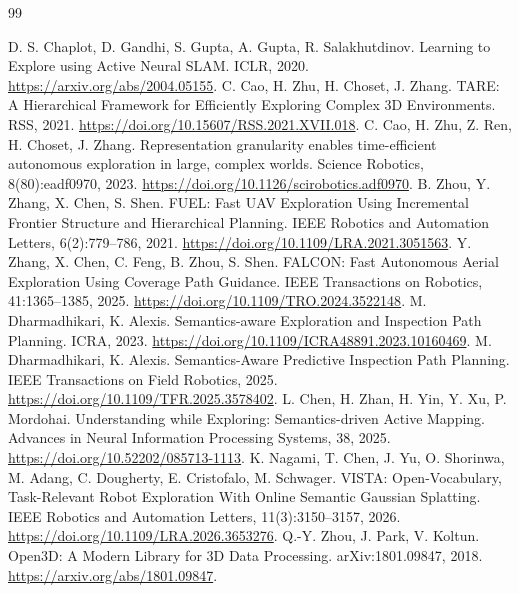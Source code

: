 \documentclass[11pt,a4paper]{article}
\begin{document}
\begin{thebibliography}{99}
\raggedright
\small
\setlength{\itemsep}{2pt}
\setlength{\parskip}{0pt}
 D. S. Chaplot, D. Gandhi, S. Gupta, A. Gupta, R. Salakhutdinov. Learning to Explore using Active Neural SLAM. ICLR, 2020. \url{https://arxiv.org/abs/2004.05155}.
 C. Cao, H. Zhu, H. Choset, J. Zhang. TARE: A Hierarchical Framework for Efficiently Exploring Complex 3D Environments. RSS, 2021. \url{https://doi.org/10.15607/RSS.2021.XVII.018}.
 C. Cao, H. Zhu, Z. Ren, H. Choset, J. Zhang. Representation granularity enables time-efficient autonomous exploration in large, complex worlds. Science Robotics, 8(80):eadf0970, 2023. \url{https://doi.org/10.1126/scirobotics.adf0970}.
 B. Zhou, Y. Zhang, X. Chen, S. Shen. FUEL: Fast UAV Exploration Using Incremental Frontier Structure and Hierarchical Planning. IEEE Robotics and Automation Letters, 6(2):779--786, 2021. \url{https://doi.org/10.1109/LRA.2021.3051563}.
 Y. Zhang, X. Chen, C. Feng, B. Zhou, S. Shen. FALCON: Fast Autonomous Aerial Exploration Using Coverage Path Guidance. IEEE Transactions on Robotics, 41:1365--1385, 2025. \url{https://doi.org/10.1109/TRO.2024.3522148}.
 M. Dharmadhikari, K. Alexis. Semantics-aware Exploration and Inspection Path Planning. ICRA, 2023. \url{https://doi.org/10.1109/ICRA48891.2023.10160469}.
 M. Dharmadhikari, K. Alexis. Semantics-Aware Predictive Inspection Path Planning. IEEE Transactions on Field Robotics, 2025. \url{https://doi.org/10.1109/TFR.2025.3578402}.
 L. Chen, H. Zhan, H. Yin, Y. Xu, P. Mordohai. Understanding while Exploring: Semantics-driven Active Mapping. Advances in Neural Information Processing Systems, 38, 2025. \url{https://doi.org/10.52202/085713-1113}.
 K. Nagami, T. Chen, J. Yu, O. Shorinwa, M. Adang, C. Dougherty, E. Cristofalo, M. Schwager. VISTA: Open-Vocabulary, Task-Relevant Robot Exploration With Online Semantic Gaussian Splatting. IEEE Robotics and Automation Letters, 11(3):3150--3157, 2026. \url{https://doi.org/10.1109/LRA.2026.3653276}.
 Q.-Y. Zhou, J. Park, V. Koltun. Open3D: A Modern Library for 3D Data Processing. arXiv:1801.09847, 2018. \url{https://arxiv.org/abs/1801.09847}.
\end{thebibliography}
\end{document}
